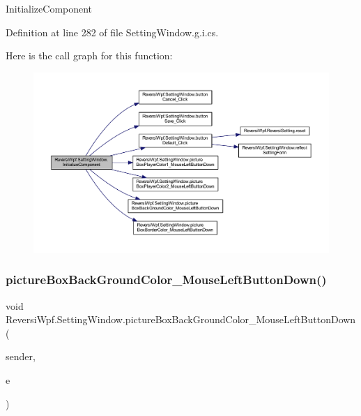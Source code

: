 Initialize\+Component 



Definition at line 282 of file Setting\+Window.\+g.\+i.\+cs.

Here is the call graph for this function\+:
\nopagebreak
\begin{figure}[H]
\begin{center}
\leavevmode
\includegraphics[width=350pt]{class_reversi_wpf_1_1_setting_window_a34db1776e5f52338539888d97f317a5a_cgraph}
\end{center}
\end{figure}
\mbox{\label{class_reversi_wpf_1_1_setting_window_ae83eafa4fc29e4891285bef8b7f5910c}} 
\subsubsection{\texorpdfstring{picture\+Box\+Back\+Ground\+Color\+\_\+\+Mouse\+Left\+Button\+Down()}{pictureBoxBackGroundColor\_MouseLeftButtonDown()}}
{\footnotesize\ttfamily void Reversi\+Wpf.\+Setting\+Window.\+picture\+Box\+Back\+Ground\+Color\+\_\+\+Mouse\+Left\+Button\+Down (\begin{DoxyParamCaption}\item[{object}]{sender,  }\item[{Mouse\+Button\+Event\+Args}]{e }\end{DoxyParamCaption})\hspace{0.3cm}{\ttfamily [private]}}



